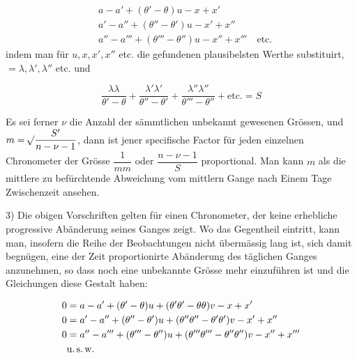 \[
\begin{aligned}
&a-a'+(\theta'-\theta)u-x+x'\\
&a'-a''+(\theta''-\theta')u-x'+x''\\
&a''-a'''+(\theta'''-\theta'')u-x''+x''' \quad \text{etc.}
\end{aligned}
\]
\noindent indem man für $u, x, x', x''$ etc. die gefundenen plausibelsten Werthe substituirt,
$=\lambda, \lambda', \lambda''$ etc. und

\[
\frac{\lambda\lambda}{\theta'-\theta} + \frac{\lambda'\lambda'}{\theta''-\theta'} + \frac{\lambda''\lambda''}{\theta'''-\theta''} + \text{etc.} = S
\]

Es sei ferner $\nu$ die Anzahl der sämmtlichen unbekannt gewesenen Grössen, und
$m=\mathord{{}^{}\!\surd}\dfrac{S'}{n-\nu-1}$, dann ist jener specifische Factor für jeden einzelnen Chronometer
der Grösse $\dfrac{1}{mm}$ oder $\dfrac{n-\nu-1}{S}$ proportional. Man kann $m$ als die mittlere zu
befürchtende Abweichung vom mittlern Gange nach Einem Tage Zwischenzeit ansehen.

3) Die obigen Vorschriften gelten für einen Chronometer, der keine erhebliche
progressive Abänderung seines Ganges zeigt. Wo das Gegentheil eintritt, kann man,
insofern die Reihe der Beobachtungen nicht übermässig lang ist, sich damit begnügen,
eine der Zeit proportionirte Abänderung des täglichen Ganges anzunehmen, so dass noch
eine unbekannte Grösse mehr einzuführen ist und die Gleichungen diese Gestalt haben:

\[
\begin{aligned}
0 &= a-a'+(\theta'-\theta)u+(\theta'\theta'-\theta\theta)v-x+x'\\
0 &= a'-a''+(\theta''-\theta')u+(\theta''\theta''-\theta'\theta')v-x'+x''\\
0 &= a''-a'''+(\theta'''-\theta'')u+(\theta'''\theta'''-\theta''\theta'')v-x''+x'''\\
&\text{u.\,s.\,w.}
\end{aligned}
\]

